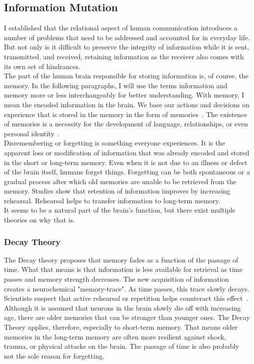 \subsection{Information Mutation}
I established that the relational aspect of human communication introduces a number of problems that need to be addressed and accounted for in everyday life. But not only is it difficult to preserve the integrity of information while it is sent, transmitted, and received, retaining information as the receiver also comes with its own set of hindrances.\\
The part of the human brain responsible for storing information is, of course, the memory. In the following paragraphs, I will use the terms information and memory more or less interchangeably for better understanding. With memory, I mean the encoded information in the brain. We base our actions and decisions on experience that is stored in the memory in the form of memories~\cite{Sherwood2015}. The existence of memories is a necessity for the development of language, relationships, or even personal identity~\cite{Eysenck2012}.\\
Disremembering or forgetting is something everyone experiences. It is the apparent loss or modification of information that was already encoded and stored in the short or long-term memory. Even when it is not due to an illness or defect of the brain itself, humans forget things. Forgetting can be both spontaneous or a gradual process after which old memories are unable to be retrieved from the memory. Studies show that retention of information improves by increasing rehearsal. Rehearsal helps to transfer information to long-term memory.~\cite{Weiten2021}\\
It seems to be a natural part of the brain's function, but there exist multiple theories on why that is.
\subsubsection{Decay Theory}
The Decay theory proposes that memory fades as a function of the passage of time. What that means is that information is less available for retrieval as time passes and memory strength decreases. The new acquisition of information creates a neurochemical "memory-trace". As time passes, this trace slowly decays. Scientists suspect that active rehearsal or repetition helps counteract this effect~\cite{Oberauer2008}. Although it is assumed that neurons in the brain slowly die off with increasing age, there are older memories that can be stronger than younger ones. The Decay Theory applies, therefore, especially to short-term memory. That means older memories in the long-term memory are often more resilient against shock, trauma, or physical attacks on the brain. The passage of time is also probably not the sole reason for forgetting.~\cite{Berman2009}
